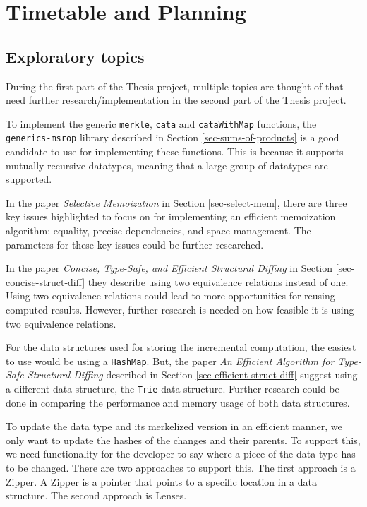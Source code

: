 \section{Timetable and Planning}
\subsection{Exploratory topics}
During the first part of the Thesis project, multiple topics are thought of that need further research/implementation in the second part of the Thesis project.

To implement the generic \texttt{merkle}, \texttt{cata} and \texttt{cataWithMap} functions, the \texttt{generics-msrop} library described in Section \ref{sec-sums-of-products} is a good candidate to use for implementing these functions. This is because it supports mutually recursive datatypes, meaning that a large group of datatypes are supported. 

In the paper \textit{Selective Memoization} in Section \ref{sec-select-mem}, there are three key issues highlighted to focus on for implementing an efficient memoization algorithm: equality, precise dependencies, and space management. The parameters for these key issues could be further researched.

In the paper \textit{Concise, Type-Safe, and Efficient Structural Diffing} in Section \ref{sec-concise-struct-diff} they describe using two equivalence relations instead of one. Using two equivalence relations could lead to more opportunities for reusing computed results. However, further research is needed on how feasible it is using two equivalence relations. 

For the data structures used for storing the incremental computation, the easiest to use would be using a \texttt{HashMap}. But, the paper \textit{An Efficient Algorithm for Type-Safe Structural Diffing} described in Section \ref{sec-efficient-struct-diff} suggest using a different data structure, the \texttt{Trie} data structure. Further research could be done in comparing the performance and memory usage of both data structures.

To update the data type and its merkelized version in an efficient manner, we only want to update the hashes of the changes and their parents. To support this, we need functionality for the developer to say where a piece of the data type has to be changed. There are two approaches to support this. The first approach is a Zipper\cite{huet1997zipper}. A Zipper is a pointer that points to a specific location in a data structure. The second approach is Lenses\cite{steckermeier2015lenses}.


